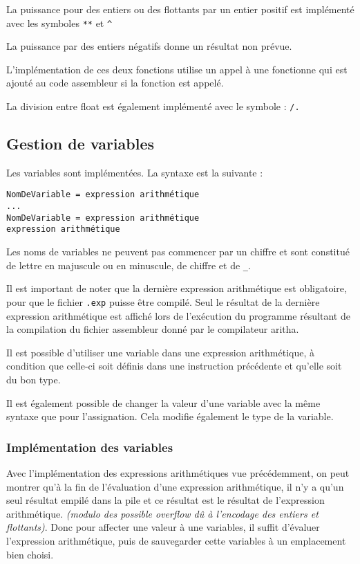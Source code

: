 \documentclass[12pt]{article}
\begin{document}
La puissance pour des entiers ou des flottants par un entier positif est implémenté avec les symboles \verb|**| et \verb|^|

La puissance par des entiers négatifs donne un résultat non prévue.

L'implémentation de ces deux fonctions utilise un appel à une fonctionne qui est ajouté au code assembleur si la fonction est appelé.

La division entre float est également implémenté avec le symbole : \verb|/.|

\subsection{Gestion de variables}
Les variables sont implémentées. La syntaxe est la suivante : 

\begin{verbatim}
NomDeVariable = expression arithmétique
...
NomDeVariable = expression arithmétique
expression arithmétique

\end{verbatim}

Les noms de variables ne peuvent pas commencer par un chiffre et sont constitué de lettre en majuscule ou en minuscule, de chiffre et de \verb|_|.

Il est important de noter que la dernière expression arithmétique est obligatoire, pour que le fichier \verb|.exp|
puisse être compilé. Seul le résultat de la dernière expression arithmétique est affiché lors de l'exécution
du programme résultant de la compilation du fichier assembleur donné par le compilateur aritha.

Il est possible d'utiliser une variable dans une expression arithmétique, à condition que celle-ci soit définis
dans une instruction précédente et qu'elle soit du bon type.

Il est également possible de changer la valeur d'une variable avec la même syntaxe que pour l'assignation. Cela modifie également le
type de la variable.

\subsubsection{Implémentation des variables}
Avec l'implémentation des expressions arithmétiques vue précédemment, on peut montrer qu'à la fin de l'évaluation d'une 
expression arithmétique, il n'y a qu'un seul résultat empilé dans la pile et ce résultat est le résultat de l'expression arithmétique.
\textit{(modulo des possible overflow dû à l'encodage des entiers et flottants)}.
Donc pour affecter une valeur à une variables, il suffit d'évaluer l'expression arithmétique, puis de sauvegarder cette variables à un 
emplacement bien choisi.
\end{document}
